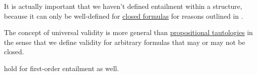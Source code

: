 \begin{comments}
  \item It is actually important that we haven't defined entailment within a structure, because it can only be well-defined for \hyperref[def:first_order_syntax/closed_formula]{closed formulas} for reasons outlined in .

  \item The concept of universal validity is more general than \hyperref[def:propositional_semantics/tautology]{propositional tautologies} in the sense that we define validity for arbitrary formulas that may or may not be closed.

  \item {} hold for first-order entailment as well.
\end{comments}

